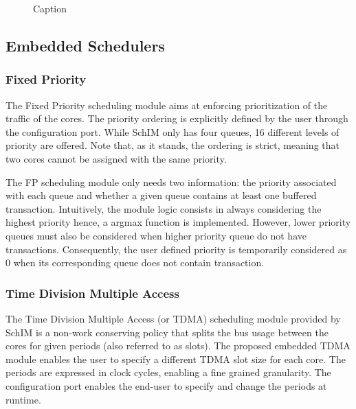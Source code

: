         \begin{figure}
            \centering
            
            \caption{Caption}
            \label{fig:SchIM_transaction_scheme_figure}
        \end{figure}

        
    \subsection{Embedded Schedulers}
        
        \subsubsection{Fixed Priority}
            The Fixed Priority scheduling module aims at enforcing prioritization of the traffic of the cores. The priority ordering is explicitly defined by the user through the configuration port. While SchIM only has four queues, 16 different levels of priority are offered. Note that, as it stands, the ordering is strict, meaning that two cores cannot be assigned with the same priority.
          
            The FP scheduling module only needs two information: the priority associated with each queue and whether a given queue contains at least one buffered transaction. Intuitively, the module logic consists in always considering the highest priority hence, a argmax function is implemented. However, lower priority queues must also be considered when higher priority queue do not have transactions. Consequently, the user defined priority is temporarily considered as 0 when its corresponding queue does not contain transaction.
        
        \subsubsection{Time Division Multiple Access}
            The Time Division Multiple Access (or TDMA) scheduling module provided by SchIM is a non-work conserving policy that splits the bus usage between the cores for given periods (also referred to as slots). The proposed embedded TDMA module enables the user to specify a different TDMA slot size for each core. The periods are expressed in clock cycles, enabling a fine grained granularity. The configuration port enables the end-user to specify and change the periods at runtime.
            
